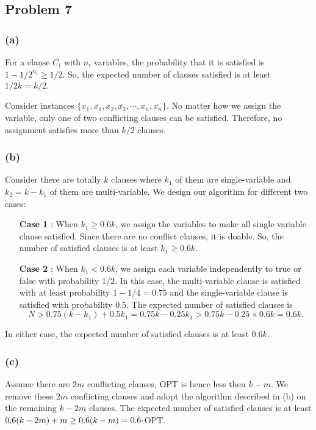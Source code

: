 \documentclass[12pt,onecolumn,a4paper]{article}
\begin{document}
\subsection*{Problem 7}
\subsubsection*{(a)} 
For a clause $C_i$ with $n_i$ variables, the probability that it is satisfied is $1-1/2^{n_i}\ge1/2$. So, the expected number of clauses satisfied is at least $1/2\dot k=k/2.$

Consider instances $\{x_1,\bar{x_1},x_2,\bar{x_2},\cdots,x_n,\bar{x_n}\}.$ No matter how we assign the variable, only one of two conflicting clauses can be satisfied. Therefore, no assignment satisfies more than
$k/2$ clauses.
\subsubsection*{(b)} 
Consider there are totally $k$ clauses where $k_1$ of them are single-variable and $k_2=k-k_1$ of them are multi-variable. We design our algorithm for different two cases:
\begin{itemize}
	\item [\textbf{Case 1}]: When $k_1\ge0.6 k$, we assign the variables to make all single-variable clause satisfied. Since there are no conflict clauses, it is doable. So, the number of satisfied clauses is at least $k_1\ge 0.6k$.
	\item [\textbf{Case 2}]: When $k_1<0.6 k$, we assign each variable independently to true or false with probability $1/2$. In this case, the multi-variable clause is satisfied with at least probability $1-1/4=0.75$ and the single-variable clause is satisfied with probability $0.5$.
	The expected number of satisfied clauses is 
	$$N>0.75(k-k_1)+0.5k_1=0.75k-0.25k_1>0.75k-0.25\times 0.6k=0.6k.$$
\end{itemize}
In either case, the expected number of satisfied clauses is at least $0.6k.$
\subsubsection*{(c)} 
Assume there are $2m$ conflicting clauses, \textsf{OPT} is hence less then $k-m$. We remove these $2m$ conflicting clauses and adopt the algorithm described in (b) on the remaining $k-2m$ clauses. The expected number of satisfied clauses is at least $0.6(k-2m)+m\ge 0.6(k-m)=0.6\cdot\empty$\textsf{OPT}.
\end{document}
